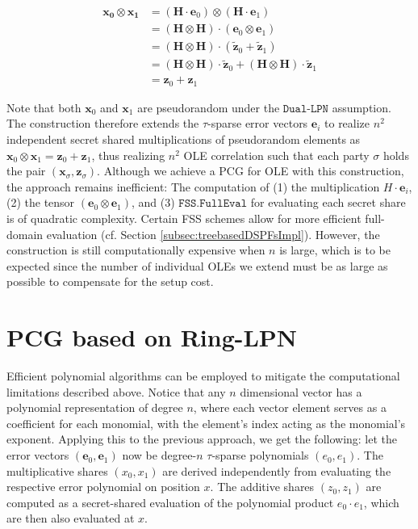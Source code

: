 \begin{equation}    
\begin{aligned}
\mathbf{x_0} \otimes \mathbf{x_1} &= (\mathbf{H}\cdot \mathbf{e}_0)\otimes(\mathbf{H}\cdot \mathbf{e}_1)\\ 
&= (\mathbf{H}\otimes \mathbf{H})\cdot (\mathbf{e}_0 \otimes \mathbf{e}_1)\\
&=(\mathbf{H}\otimes \mathbf{H})\cdot (\mathbf{\tilde{z}}_0 + \mathbf{\tilde{z}}_1) \\
&=(\mathbf{H}\otimes \mathbf{H})\cdot \mathbf{\tilde{z}}_0 + (\mathbf{H}\otimes \mathbf{H})\cdot \mathbf{\tilde{z}}_1 \\
&= \mathbf{z}_0 + \mathbf{z}_1 
\label{eq:pcgNaiveProof}
\end{aligned}
\end{equation}

Note that both $\mathbf{x}_0$ and $\mathbf{x}_1$ are pseudorandom under the $\texttt{Dual-LPN}$ assumption. The construction therefore extends the $\tau$-sparse error vectors $\mathbf{e}_i$ to realize $n^2$ independent secret shared multiplications of pseudorandom elements as $\mathbf{x}_0\otimes\mathbf{x}_1=\mathbf{z}_0+\mathbf{z}_1$, thus realizing $n^2$ OLE correlation such that each party $\sigma$ holds the pair $(\mathbf{x}_\sigma, \mathbf{z}_\sigma)$. Although we achieve a PCG for OLE with this construction, the approach remains inefficient: The computation of (1) the multiplication $H\cdot \mathbf{e}_i$, (2) the tensor $(\mathbf{e}_0 \otimes \mathbf{e}_1)$, and (3) $\texttt{FSS.FullEval}$ for evaluating each secret share is of quadratic complexity. Certain FSS schemes allow for more efficient full-domain evaluation (cf. Section \ref{subsec:treebasedDSPFsImpl}). However, the construction is still computationally expensive when $n$ is large, which is to be expected since the number of individual OLEs we extend must be as large as possible to compensate for the setup cost.

\section{PCG based on Ring-LPN}
\label{subsec:imrpoved_pcg}
Efficient polynomial algorithms can be employed to mitigate the computational limitations described above. Notice that any $n$ dimensional vector has a polynomial representation of degree \(n\), where each vector element serves as a coefficient for each monomial, with the element's index acting as the monomial's exponent. Applying this to the previous approach, we get the following: let the error vectors $(\mathbf{e}_0, \mathbf{e}_1)$ now be degree-$n$ $\tau$-sparse polynomials $(e_0, e_1)$. The multiplicative shares $(x_0, x_1)$ are derived independently from evaluating the respective error polynomial on position $x$. The additive shares $(z_0, z_1)$ are computed as a secret-shared evaluation of the polynomial product $e_0\cdot e_1$, which are then also evaluated at $x$.

